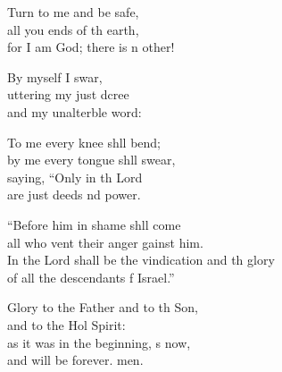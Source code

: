 \begin{psalmverse}
\begin{patverse}
Turn to me and be safe,\Flex\\
all you ends of th earth,\Med\\
for I am God; there is n other!

By myself I swar,\Flex\\
uttering my just dcree\Med\\
and my unalterble word:

To me every knee shll bend;\Med\\
by me every tongue shll swear,\\
saying, “Only in th Lord\Med\\
are just deeds nd power.

“Before him in shame shll come\Med\\
all who vent their anger gainst him.\\
In the Lord shall be the vindication and th glory\Med\\
of all the descendants f Israel.”

Glory to the Father and to th Son,\Med\\
and to the Hol Spirit:\\
as it was in the beginning, \pointup{\i}s now,\Med\\
and will be forever. men.
  \end{patverse}
\end{psalmverse}
